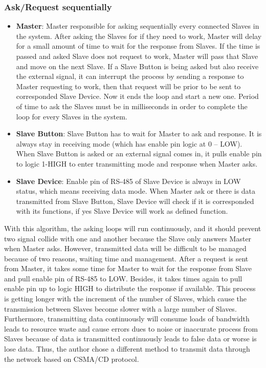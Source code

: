     \subsubsection{Ask/Request sequentially}
    \begin{itemize}
    \item \textbf{Master}: Master responsible for asking sequentially every connected Slaves in the system. After asking the Slaves for if they need to work, Master will delay for a small amount of time to wait for the response from Slaves. If the time is passed and asked Slave does not request to work, Master will pass that Slave and move on the next Slave. If a Slave Button is being asked but also receive the external signal, it can interrupt the process by sending a response to Master requesting to work, then that request will be prior to be sent to corresponded Slave Device. Now it ends the loop and start a new one. Period of time to ask the Slaves must be in milliseconds in order to complete the loop for every Slaves in the system.
    \item \textbf{Slave Button}: Slave Button has to wait for Master to ask and response. It is always stay in receiving mode (which has enable pin logic at 0 – LOW). When Slave Button is asked or an external signal comes in, it pulls enable pin to logic 1-HIGH to enter transmitting mode and response when Master asks.
    \item \textbf{Slave Device}: Enable pin of RS-485 of Slave Device is always in LOW status, which means receiving data mode. When Master ask or there is data transmitted from Slave Button, Slave Device will check if it is corresponded with its functions, if yes Slave Device will work as defined function.
    \end{itemize}
    
    With this algorithm, the asking loops will run continuously, and it should prevent two signal collide with one and another because the Slave only answers Master when Master asks. However, transmitted data will be difficult to be managed because of two reasons, waiting time and management. After a request is sent from Master, it takes some time for Master to wait for the response from Slave and pull enable pin of RS-485 to LOW. Besides, it takes times again to pull enable pin up to logic HIGH to distribute the response if available. This process is getting longer with the increment of the number of Slaves, which cause the transmission between Slaves become slower with a large number of Slaves. Furthermore, transmitting data continuously will consume loads of bandwidth leads to resource waste and cause errors dues to noise or inaccurate process from Slaves because of data is transmitted continuously leads to false data or worse is lose data. Thus, the author chose a different method to transmit data through the network based on CSMA/CD protocol.

